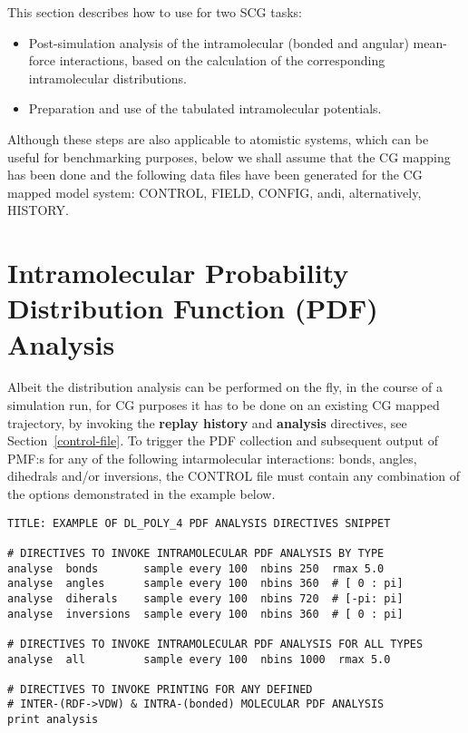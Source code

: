 This section describes how to use \D for two SCG tasks:

\begin{itemize}
\item Post-simulation analysis of the intramolecular (bonded and angular)
mean-force interactions, based on the calculation of the corresponding
intramolecular distributions.
\item Preparation and use of the tabulated intramolecular potentials.
\end{itemize}

 Although these steps are also applicable to
atomistic systems, which can be useful for benchmarking purposes,
below we shall assume that the CG mapping has been done and the following
data files have been generated for the CG mapped model system:
CONTROL, FIELD, CONFIG, andi, alternatively, HISTORY.

\section{Intramolecular Probability Distribution Function (PDF) Analysis}
\label{IPDF-analysis}

Albeit the distribution analysis can be performed on the fly,
in the course of a simulation run, for CG purposes it has
to be done on an existing CG mapped trajectory, by invoking
the {\bf replay history} and {\bf analysis} directives,
see Section~\ref{control-file}.
To trigger the PDF collection and subsequent output of PMF:s
for any of the following intarmolecular interactions: bonds,
angles, dihedrals and/or inversions, the CONTROL file must
contain any combination of the options demonstrated
in the example below.

\begin{verbatim}
TITLE: EXAMPLE OF DL_POLY_4 PDF ANALYSIS DIRECTIVES SNIPPET

# DIRECTIVES TO INVOKE INTRAMOLECULAR PDF ANALYSIS BY TYPE
analyse  bonds       sample every 100  nbins 250  rmax 5.0
analyse  angles      sample every 100  nbins 360  # [ 0 : pi]
analyse  diherals    sample every 100  nbins 720  # [-pi: pi]
analyse  inversions  sample every 100  nbins 360  # [ 0 : pi]

# DIRECTIVES TO INVOKE INTRAMOLECULAR PDF ANALYSIS FOR ALL TYPES
analyse  all         sample every 100  nbins 1000  rmax 5.0

# DIRECTIVES TO INVOKE PRINTING FOR ANY DEFINED
# INTER-(RDF->VDW) & INTRA-(bonded) MOLECULAR PDF ANALYSIS
print analysis
\end{verbatim}

